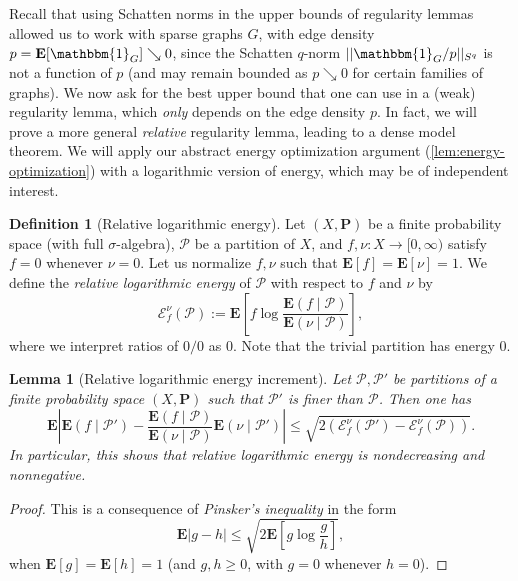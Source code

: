 \documentclass[reqno,11pt]{amsart}
\newtheorem{lemma}[theorem]{Lemma}
\theoremstyle{definition}
\newtheorem{definition}[theorem]{Definition}
\theoremstyle{remark}
\numberwithin{equation}{section}
\renewcommand{\P}{\mathbf{P}}
\newcommand{\E}{\mathbf{E}}
\newcommand{\mE}{\mathcal{E}}
\newcommand{\mP}{\mathcal{P}}
\newcommand{\one}{\mathbbm{1}}
\begin{document}


Recall that using Schatten norms in the upper bounds of regularity lemmas allowed us to work with sparse graphs $G$, with edge density $p = \E[\one_G] \searrow 0$, since the Schatten $q$-norm $||\one_G/p||_{S^q}$ is not a function of $p$ (and may remain bounded as $p \searrow 0$ for certain families of graphs). We now ask for the best upper bound that one can use in a (weak) regularity lemma, which \emph{only} depends on the edge density $p$. In fact, we will prove a more general \emph{relative} regularity lemma, leading to a dense model theorem. We will apply our abstract energy optimization argument (\cref{lem:energy-optimization}) with a logarithmic version of energy, which may be of independent interest. 

\begin{definition}[Relative logarithmic energy]
Let $(X, \P)$ be a finite probability space (with full $\sigma$-algebra), $\mP$ be a partition of $X$, and $f, \nu : X \to [0, \infty)$ satisfy $f = 0$ whenever $\nu = 0$. Let us normalize $f, \nu$ such that $\E[f] = \E[\nu] = 1$. We define the \emph{relative logarithmic energy} of $\mP$ with respect to $f$ and $\nu$ by
\[
    \mE_f^\nu(\mP) := 
    \E \left[f \log \frac{\E(f \mid \mP)}{\E(\nu \mid \mP)} \right],
\]
where we interpret ratios of $0/0$ as $0$. Note that the trivial partition has energy $0$.
\end{definition}

\begin{lemma}[Relative logarithmic energy increment] \label{lem:logarithmic-energy-increment}
Let $\mP, \mP'$ be partitions of a finite probability space $(X, \P)$ such that $\mP'$ is finer than $\mP$. Then one has
\[
    \E \left\vert \E(f \mid \mP') - \frac{\E(f \mid \mP)}{\E(\nu \mid \mP)} \E(\nu \mid \mP') \right\vert 
    \le \sqrt{2\left(\mE_f^\nu(\mP') - \mE_f^\nu(\mP)\right)}.
\]
In particular, this shows that relative logarithmic energy is nondecreasing and nonnegative.
\end{lemma}

\begin{proof}
This is a consequence of \emph{Pinsker's inequality} in the form
\[
    \E |g - h| \le \sqrt{2 \E \left[ g \log \frac{g}{h} \right]},
\]
when $\E[g] = \E[h] = 1$ (and $g, h \ge 0$, with $g = 0$ whenever $h = 0$).
\end{proof}
\end{document}
